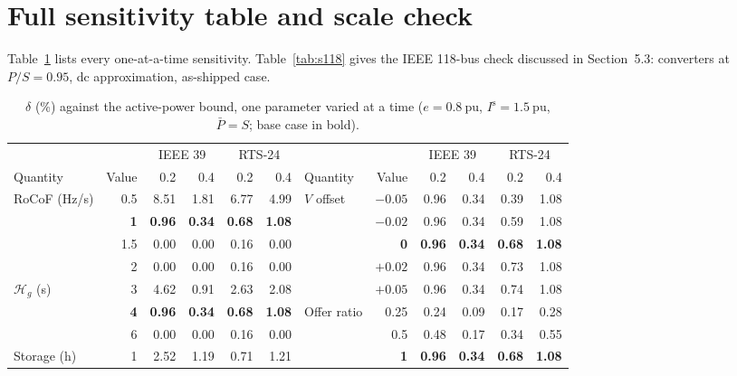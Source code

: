 \documentclass[11pt,a4paper]{article}
\newcommand{\pu}{\ensuremath{\mathrm{pu}}}
\begin{document}
\section{Full sensitivity table and scale check}
\label{s:sensitivity}

Table~\ref{tab:sensfull} lists every one-at-a-time sensitivity.
Table~\ref{tab:s118} gives the IEEE 118-bus check discussed in
Section~5.3: converters at $P/S = 0.95$, dc approximation, as-shipped case.

\begin{table}[h]
  \caption{$\delta$ (\%) against the active-power bound, one parameter varied
  at a time ($e = \SI{0.8}{\pu}$, $I^{\mathrm{s}} = \SI{1.5}{\pu}$,
  $\bar{P} = S$; base case in bold).}
  \label{tab:sensfull}
  \centering
  \small
  \begin{tabular}{l r rr rr @{\hspace{2em}} l r rr rr}
    \toprule
    & & \multicolumn{2}{c}{IEEE 39} & \multicolumn{2}{c}{RTS-24}
    & & & \multicolumn{2}{c}{IEEE 39} & \multicolumn{2}{c}{RTS-24} \\
    \cmidrule(lr){3-4}\cmidrule(lr){5-6}\cmidrule(lr){9-10}\cmidrule(l){11-12}
    Quantity & Value & 0.2 & 0.4 & 0.2 & 0.4
    & Quantity & Value & 0.2 & 0.4 & 0.2 & 0.4 \\
    \midrule
    \multirow{4}{*}{RoCoF (Hz/s)}
      & 0.5 & 8.51 & 1.81 & 6.77 & 4.99
      & \multirow{5}{*}{$V$ offset}
      & $-0.05$ & 0.96 & 0.34 & 0.39 & 1.08 \\
      & \textbf{1} & \textbf{0.96} & \textbf{0.34} & \textbf{0.68} & \textbf{1.08}
      & & $-0.02$ & 0.96 & 0.34 & 0.59 & 1.08 \\
      & 1.5 & 0.00 & 0.00 & 0.16 & 0.00
      & & \textbf{0} & \textbf{0.96} & \textbf{0.34} & \textbf{0.68} & \textbf{1.08} \\
      & 2 & 0.00 & 0.00 & 0.16 & 0.00
      & & $+0.02$ & 0.96 & 0.34 & 0.73 & 1.08 \\
    \multirow{3}{*}{$\mathcal{H}_g$ (s)}
      & 3 & 4.62 & 0.91 & 2.63 & 2.08
      & & $+0.05$ & 0.96 & 0.34 & 0.74 & 1.08 \\
      & \textbf{4} & \textbf{0.96} & \textbf{0.34} & \textbf{0.68} & \textbf{1.08}
      & \multirow{5}{*}{Offer ratio}
      & 0.25 & 0.24 & 0.09 & 0.17 & 0.28 \\
      & 6 & 0.00 & 0.00 & 0.16 & 0.00
      & & 0.5 & 0.48 & 0.17 & 0.34 & 0.55 \\
    \multirow{4}{*}{Storage (h)}
      & 1 & 2.52 & 1.19 & 0.71 & 1.21
      & & \textbf{1} & \textbf{0.96} & \textbf{0.34} & \textbf{0.68} & \textbf{1.08} \\

\end{tabular}
\end{table}
\end{document}
